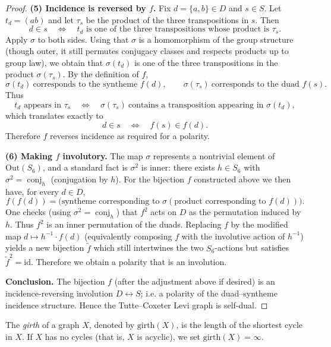 \documentclass[12pt,a4paper,openany]{book}
\begin{document}
\begin{proof}
\medskip
\textbf{(5) Incidence is reversed by \(f\).}  
Fix \(d=\{a,b\}\in D\) and \(s\in S\). Let \(t_d=(ab)\) and let \(\tau_s\) be the product of the three transpositions in \(s\). Then
\[
d\in s \quad\Longleftrightarrow\quad t_d \text{ is one of the three transpositions whose product is }\tau_s.
\]
Apply \(\sigma\) to both sides. Using that \(\sigma\) is a homomorphism of the group structure (though outer, it still permutes conjugacy classes and respects products up to group law), we obtain that \( \sigma(t_d)\) is one of the three transpositions in the product \(\sigma(\tau_s)\). By the definition of \(f\),
\[
\sigma(t_d)\ \text{corresponds to the syntheme } f(d),\qquad
\sigma(\tau_s)\ \text{corresponds to the duad } f(s).
\]
Thus
\[
t_d \text{ appears in } \tau_s \quad\Longleftrightarrow\quad \sigma(\tau_s)\ \text{contains a transposition appearing in }\sigma(t_d),
\]
which translates exactly to
\[
d\in s \quad\Longleftrightarrow\quad f(s)\in f(d).
\]
Therefore \(f\) reverses incidence as required for a polarity.

\medskip
\textbf{(6) Making \(f\) involutory.}  
The map \(\sigma\) represents a nontrivial element of \(\mathrm{Out}(S_6)\), and a standard fact is \(\sigma^2\) is inner: there exists \(h\in S_6\) with \(\sigma^2=\operatorname{conj}_h\) (conjugation by \(h\)). For the bijection \(f\) constructed above we then have, for every \(d\in D\),
\[
f(f(d)) = \text{(syntheme corresponding to }\sigma(\text{product corresponding to }f(d))\text{)}.
\]
One checks (using \(\sigma^2=\operatorname{conj}_h\)) that \(f^2\) acts on \(D\) as the permutation induced by \(h\). Thus \(f^2\) is an inner permutation of the duads. Replacing \(f\) by the modified map \(d\mapsto h^{-1}\cdot f(d)\) (equivalently composing \(f\) with the involutive action of \(h^{-1}\)) yields a new bijection \(\tilde f\) which still intertwines the two \(S_6\)-actions but satisfies \(\tilde f^2=\mathrm{id}\). Therefore we obtain a polarity that is an involution.

\medskip
\textbf{Conclusion.} The bijection \(f\) (after the adjustment above if desired) is an incidence-reversing involution \(D\leftrightarrow S\); i.e. a polarity of the duad–syntheme incidence structure. Hence the Tutte--Coxeter Levi graph is self-dual.
\end{proof}

\bigskip

\noindent
The \emph{girth} of a graph \(X\), denoted by \(\mathrm{girth}(X)\), 
is the length of the shortest cycle in \(X\).
If \(X\) has no cycles (that is, \(X\) is acyclic), we set \(\mathrm{girth}(X)=\infty\).
\end{document}
